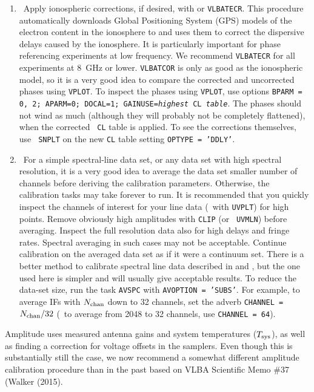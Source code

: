 \begin{enumerate}
\item\ {Apply ionospheric corrections, if desired, with or
{\tt VLBATECR}\@.  This procedure automatically downloads  Global
Positioning System (GPS) models of the electron content in the
ionosphere to and uses them to correct the
dispersive delays caused by the ionosphere.  It is particularly
important for phase referencing experiments at low frequency.  We
recommend {\tt VLBATECR} for all experiments at 8~GHz or lower.
{\tt VLBATCOR} is only as good as the ionospheric model, so it
is a very good idea to compare the corrected and uncorrected phases
using {\tt VPLOT}\@.  To inspect the phases using {\tt VPLOT}, use
options {\tt BPARM = 0, 2; APARM=0; DOCAL=1; GAINUSE={\it highest} CL
  {\it table}}\@.  The phases should not wind as much (although they
will probably not be completely flattened), when the corrected {\tt
  CL} table is applied.  To see the corrections themselves, use {\tt
  SNPLT} on the new {\tt CL} table setting {\tt OPTYPE =
  'DDLY'}}\@.

\item\ {For a simple spectral-line data set, or any data set with high
spectral resolution, it is
a very good idea to average the data set smaller number of channels before
deriving the calibration parameters.  Otherwise, the calibration tasks
may take forever to run.  It is recommended that you quickly inspect
the channels of interest for your line data (\eg\ with {\tt UVPLT}\@)
for high points. Remove obviously high amplitudes with {\tt CLIP} (or
\eg\ {\tt UVMLN}\@) before averaging.  Inspect the full resolution
data also for high delays and fringe rates.  Spectral averaging in
such cases may not be acceptable.  Continue calibration on the
averaged data set as if it were a continuum set.  There is a better
method to calibrate spectral line data described in  and
, but the one used here is simpler and will usually
give acceptable results.  To reduce the data-set size, run the task
{\tt AVSPC} with {\tt AVOPTION = 'SUBS'}\@.  For example, to
average IFs with $N_{\rm chan}$ down to 32 channels, set the adverb
{\tt CHANNEL = $N_{\rm chan}/32$} (\eg\ to average from 2048 to 32
channels, use {\tt CHANNEL = 64}\@).}

\end{enumerate}


Amplitude  uses measured antenna gains and system
temperatures ($T_{\rm sys}$), as well as finding a correction for
voltage offsets in the samplers.  Even though this is substantially still
the case, we now recommend a somewhat different
amplitude calibration procedure than in the past based on VLBA Scientific
Memo \#37 (Walker (2015). 

